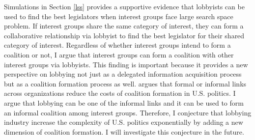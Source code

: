 \documentclass{article}
\begin{document}
Simulations in Section \ref{lss} 
provides a supportive evidence that 
lobbyists can be used to find the best legislators
when interest groups face large search space problem.
If interest groups share the 
same category of interest, they can form a collaborative
relationship via lobbyist 
to find the best legislator for their shared category of interest.
Regardless of whether interest groups intend to form a coalition or not, 
I argue that interest groups 
can form a coalition with other interest groups 
via lobbyists.
This finding is important 
because it provides a new perspective on 
lobbying not just as a delegated information acquisition process
but as a coalition formation process as well.
\cite{hula} argues that 
formal or informal links across organizations reduce the costs of coalition formation in U.S. politics.
I argue that lobbying can be one of the informal links 
and it can be used to form an informal coalition among interest groups.
Therefore, I conjecture that lobbying industry 
increase the complexity of U.S. politics exponentially 
by adding a new dimension of coalition formation. 
I will investigate this conjecture in the future.







\end{document}
